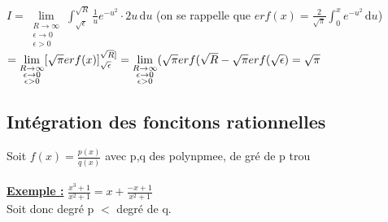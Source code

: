 \documentclass[12pt,a4paper]{article}
\newcommand{\limite}{\lim\limits_}
\newcommand{\evid}[1]{\textbf{\underline{#1}}}
\begin{document}
{$I = \limite{\substack{R \to \infty \\ \epsilon \to 0 \\ \epsilon > 0}} \int_{\sqrt{\epsilon}}^{\sqrt{R}} \frac{1}{u}e^{-u^2}\cdot 2u \, \mathrm du$ (on se rappelle que $erf(x) = \frac{2}{\sqrt{\pi}} \int_0^x e^{-u^2} \, \mathrm du$)\\
$= \limite{\substack{R \to \infty \\ \epsilon \to 0 \\ \epsilon > 0}} [\sqrt{\pi}erf(x)]_{\sqrt{\epsilon}}^{\sqrt{R}]}\\
= \limite{\substack{R \to \infty \\ \epsilon \to 0 \\ \epsilon > 0}} (\sqrt{\pi} erf(\sqrt{R} - \sqrt{\pi}erf(\sqrt{\epsilon}) = \sqrt{\pi}$

\subsection{Intégration des foncitons rationnelles}
Soit $f(x) = \frac{p(x)}{q(x)}$ avec p,q des polynpmee, de gré de p {trou}\\
\\
\evid{Exemple :} $ \frac{x^3+1}{x^2+1} = x + \frac{-x+1}{x^2+1}$\\
Soit donc degré p $<$ degré de q.

}
\end{document}
